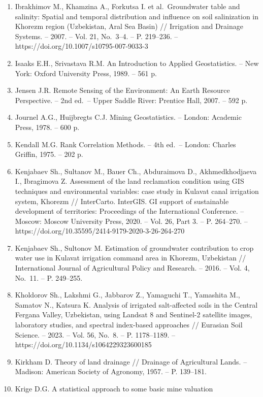 \documentclass[14pt,a4paper,oneside]{extreport}
\begin{document}
\begin{enumerate}
\item
  Ibrakhimov M., Khamzina A., Forkutsa I. et al.~Groundwater table and
  salinity: Spatial and temporal distribution and influence on soil
  salinization in Khorezm region (Uzbekistan, Aral Sea Basin) //
  Irrigation and Drainage Systems. -- 2007. -- Vol. 21, No.~3--4. -- P.
  219--236. -- https://doi.org/10.1007/s10795-007-9033-3
\item
  Isaaks E.H., Srivastava R.M. An Introduction to Applied Geostatistics.
  -- New York: Oxford University Press, 1989. -- 561 p.
\item
  Jensen J.R. Remote Sensing of the Environment: An Earth Resource
  Perspective. -- 2nd ed.~-- Upper Saddle River: Prentice Hall, 2007. --
  592 p.
\item
  Journel A.G., Huijbregts C.J. Mining Geostatistics. -- London:
  Academic Press, 1978. -- 600 p.
\item
  Kendall M.G. Rank Correlation Methods. -- 4th ed.~-- London: Charles
  Griffin, 1975. -- 202 p.
\item
  Kenjabaev Sh., Sultanov M., Bauer Ch., Abduraimova D., Akhmedkhodjaeva
  I., Ibragimova Z. Assessment of the land reclamation condition using
  GIS techniques and environmental variables: case study in Kulavat
  canal irrigation system, Khorezm // InterCarto. InterGIS. GI support
  of sustainable development of territories: Proceedings of the
  International Conference. -- Moscow: Moscow University Press, 2020. --
  Vol. 26, Part 3. -- P. 264--270. --
  https://doi.org/10.35595/2414-9179-2020-3-26-264-270
\item
  Kenjabaev Sh., Sultonov M. Estimation of groundwater contribution to
  crop water use in Kulavat irrigation command area in Khorezm,
  Uzbekistan // International Journal of Agricultural Policy and
  Research. -- 2016. -- Vol. 4, No.~11. -- P. 249--255.
\item
  Kholdorov Sh., Lakshmi G., Jabbarov Z., Yamaguchi T., Yamashita M.,
  Samatov N., Katsura K. Analysis of irrigated salt-affected soils in
  the Central Fergana Valley, Uzbekistan, using Landsat 8 and Sentinel-2
  satellite images, laboratory studies, and spectral index-based
  approaches // Eurasian Soil Science. -- 2023. -- Vol. 56, No.~8. -- P.
  1178--1189. -- https://doi.org/10.1134/s1064229323600185
\item
  Kirkham D. Theory of land drainage // Drainage of Agricultural Lands.
  -- Madison: American Society of Agronomy, 1957. -- P. 139--181.
\item
  Krige D.G. A statistical approach to some basic mine valuation

\end{enumerate}
\end{document}
